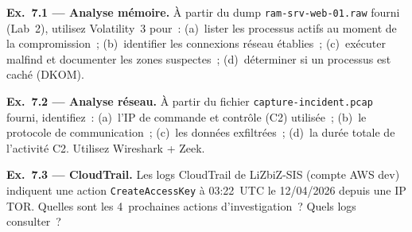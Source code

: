 \begin{boxexo}
\textbf{Ex.~7.1 — Analyse mémoire.}
À partir du dump \texttt{ram-srv-web-01.raw} fourni (Lab~2), utilisez
Volatility~3 pour~: (a)~lister les processus actifs au moment de la
compromission~; (b)~identifier les connexions réseau établies~;
(c)~exécuter malfind et documenter les zones suspectes~;
(d)~déterminer si un processus est caché (DKOM).

\medskip\textbf{Ex.~7.2 — Analyse réseau.}
À partir du fichier \texttt{capture-incident.pcap} fourni, identifiez~:
(a)~l'IP de commande et contrôle (C2) utilisée~; (b)~le protocole
de communication~; (c)~les données exfiltrées~; (d)~la durée totale
de l'activité C2. Utilisez Wireshark + Zeek.

\medskip\textbf{Ex.~7.3 — CloudTrail.}
Les logs CloudTrail de LiZbiZ-SIS (compte AWS dev) indiquent une
action \texttt{CreateAccessKey} à 03:22~UTC le 12/04/2026 depuis
une IP TOR. Quelles sont les 4~prochaines actions d'investigation~?
Quels logs consulter~?
\end{boxexo}
